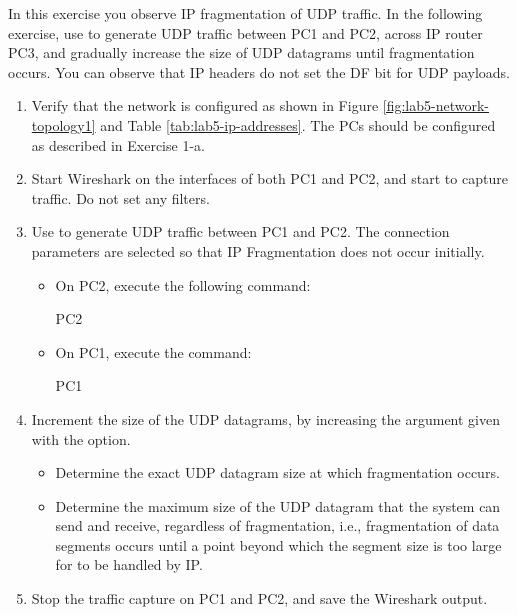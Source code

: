 In this exercise you observe IP fragmentation of UDP traffic. In the following exercise, use  to generate UDP traffic between PC1 and PC2, across IP router PC3, and gradually increase the size of UDP datagrams until fragmentation occurs. You can observe that IP headers do not set the DF bit for UDP payloads.

\begin{enumerate}
	\item Verify that the network is configured as shown in Figure \ref{fig:lab5-network-topology1} and Table \ref{tab:lab5-ip-addresses}. The PCs should be configured as described in Exercise 1-a.
	\item Start Wireshark on the  interfaces of both PC1 and PC2, and start to capture traffic. Do not set any filters.
	\item Use  to generate UDP traffic between PC1 and PC2. The connection parameters are selected so that IP Fragmentation does not occur initially.
		\begin{itemize}
			\item On PC2, execute the following command:
				\begin{cmdblock}
	PC2%
				\end{cmdblock}
			\item On PC1, execute the command:
				\begin{cmdblock}
	PC1%
				\end{cmdblock}
		\end{itemize}
	\item Increment the size of the UDP datagrams, by increasing the argument given with the  option.
		\begin{itemize}
			\item Determine the exact UDP datagram size at which fragmentation occurs.
			\item Determine the maximum size of the UDP datagram that the system can send and receive, regardless of fragmentation, i.e., fragmentation of data segments occurs until a point beyond which the segment size is too large for to be handled by IP.
		\end{itemize}
	\item Stop the traffic capture on PC1 and PC2, and save the Wireshark output.
\end{enumerate}

\begin{questions}
\end{questions}

